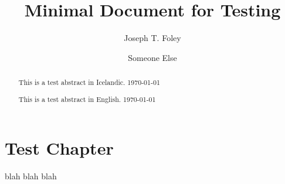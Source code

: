 \documentclass{memoir}
\title{Minimal Document for Testing}
\author{Joseph T. Foley \and Someone Else}
\date{\DTMdisplaydate{2020}{2}{2}{-1}}
\begin{document}


\maketitle

\begin{abstract}
  This is a test abstract in Icelandic.
  \today
\end{abstract}

\begin{abstract}
  This is a test abstract in English.
  \today
\end{abstract}

\newpage
\chapter{Test Chapter}
blah blah blah

\end{document}

